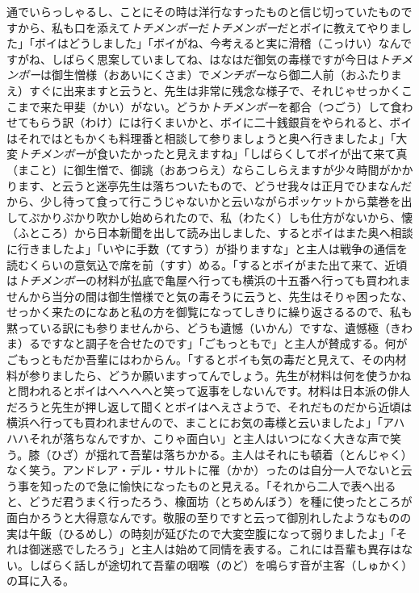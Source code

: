 通でいらっしゃるし、ことにその時は洋行なすったものと信じ切っていたものですから、私も口を添えて\emph{トチメンボー}だ\emph{トチメンボー}だとボイに教えてやりました」「ボイはどうしました」「ボイがね、今考えると実に滑稽（こっけい）なんですがね、しばらく思案していましてね、はなはだ御気の毒様ですが今日は\emph{トチメンボー}は御生憎様（おあいにくさま）で\emph{メンチボー}なら御二人前（おふたりまえ）すぐに出来ますと云うと、先生は非常に残念な様子で、それじゃせっかくここまで来た甲斐（かい）がない。どうか\emph{トチメンボー}を都合（つごう）して食わせてもらう訳（わけ）には行くまいかと、ボイに二十銭銀貨をやられると、ボイはそれではともかくも料理番と相談して参りましょうと奥へ行きましたよ」「大変\emph{トチメンボー}が食いたかったと見えますね」「しばらくしてボイが出て来て真（まこと）に御生憎で、御誂（おあつらえ）ならこしらえますが少々時間がかかります、と云うと迷亭先生は落ちついたもので、どうせ我々は正月でひまなんだから、少し待って食って行こうじゃないかと云いながらポッケットから葉巻を出してぷかりぷかり吹かし始められたので、私（わたく）しも仕方がないから、懐（ふところ）から日本新聞を出して読み出しました、するとボイはまた奥へ相談に行きましたよ」「いやに手数（てすう）が掛りますな」と主人は戦争の通信を読むくらいの意気込で席を前（すす）める。「するとボイがまた出て来て、近頃は\emph{トチメンボー}の材料が払底で亀屋へ行っても横浜の十五番へ行っても買われませんから当分の間は御生憎様でと気の毒そうに云うと、先生はそりゃ困ったな、せっかく来たのになあと私の方を御覧になってしきりに繰り返さるるので、私も黙っている訳にも参りませんから、どうも遺憾（いかん）ですな、遺憾極（きわま）るですなと調子を合せたのです」「ごもっともで」と主人が賛成する。何がごもっともだか吾輩にはわからん。「するとボイも気の毒だと見えて、その内材料が参りましたら、どうか願いますってんでしょう。先生が材料は何を使うかねと問われるとボイはへへへへと笑って返事をしないんです。材料は日本派の俳人だろうと先生が押し返して聞くとボイはへえさようで、それだものだから近頃は横浜へ行っても買われませんので、まことにお気の毒様と云いましたよ」「アハハハそれが落ちなんですか、こりゃ面白い」と主人はいつになく大きな声で笑う。膝（ひざ）が揺れて吾輩は落ちかかる。主人はそれにも頓着（とんじゃく）なく笑う。アンドレア・デル・サルトに罹（かか）ったのは自分一人でないと云う事を知ったので急に愉快になったものと見える。「それから二人で表へ出ると、どうだ君うまく行ったろう、橡面坊（とちめんぼう）を種に使ったところが面白かろうと大得意なんです。敬服の至りですと云って御別れしたようなものの実は午飯（ひるめし）の時刻が延びたので大変空腹になって弱りましたよ」「それは御迷惑でしたろう」と主人は始めて同情を表する。これには吾輩も異存はない。しばらく話しが途切れて吾輩の咽喉（のど）を鳴らす音が主客（しゅかく）の耳に入る。\\
